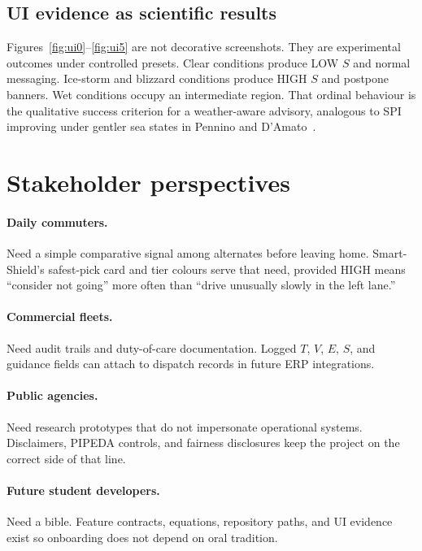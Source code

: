 \documentclass[11pt,a4paper]{article}
\begin{document}
\subsection{UI evidence as scientific results}
Figures~\ref{fig:ui0}--\ref{fig:ui5} are not decorative screenshots. They are experimental outcomes under controlled presets. Clear conditions produce LOW $S$ and normal messaging. Ice-storm and blizzard conditions produce HIGH $S$ and postpone banners. Wet conditions occupy an intermediate region. That ordinal behaviour is the qualitative success criterion for a weather-aware advisory, analogous to SPI improving under gentler sea states in Pennino and D'Amato~\citep{pennino2024weather}.

\newpage
\section*{Stakeholder perspectives}
\label{sec:stake}

\paragraph{Daily commuters.} Need a simple comparative signal among alternates before leaving home. Smart-Shield's safest-pick card and tier colours serve that need, provided HIGH means ``consider not going'' more often than ``drive unusually slowly in the left lane.''

\paragraph{Commercial fleets.} Need audit trails and duty-of-care documentation. Logged $T$, $V$, $E$, $S$, and guidance fields can attach to dispatch records in future ERP integrations.

\paragraph{Public agencies.} Need research prototypes that do not impersonate operational systems. Disclaimers, PIPEDA controls, and fairness disclosures keep the project on the correct side of that line.

\paragraph{Future student developers.} Need a bible. Feature contracts, equations, repository paths, and UI evidence exist so onboarding does not depend on oral tradition.
\end{document}
